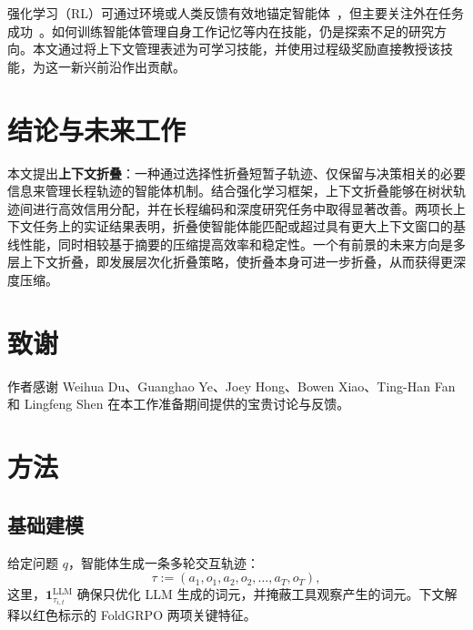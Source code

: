 强化学习（RL）可通过环境或人类反馈有效地锚定智能体~\citep{Zhang2025TheLO,Qiao2025WebResearcherUU}，但主要关注外在任务成功~\citep{DeepSeekAI2025DeepSeekR1IR}。如何训练智能体管理自身工作记忆等内在技能，仍是探索不足的研究方向。本文通过将上下文管理表述为可学习技能，并使用过程级奖励直接教授该技能，为这一新兴前沿作出贡献。

\section{结论与未来工作}
本文提出\textbf{上下文折叠}：一种通过选择性折叠短暂子轨迹、仅保留与决策相关的必要信息来管理长程轨迹的智能体机制。结合强化学习框架，上下文折叠能够在树状轨迹间进行高效信用分配，并在长程编码和深度研究任务中取得显著改善。两项长上下文任务上的实证结果表明，折叠使智能体能匹配或超过具有更大上下文窗口的基线性能，同时相较基于摘要的压缩提高效率和稳定性。一个有前景的未来方向是多层上下文折叠，即发展层次化折叠策略，使折叠本身可进一步折叠，从而获得更深度压缩。

\section*{致谢}
作者感谢 Weihua Du、Guanghao Ye、Joey Hong、Bowen Xiao、Ting-Han Fan 和 Lingfeng Shen 在本工作准备期间提供的宝贵讨论与反馈。

\section{方法}

\subsection{基础建模}
给定问题 $q$，智能体生成一条多轮交互轨迹：
\begin{equation}
    \tau := (a_1, o_1, a_2, o_2, \ldots, a_T, o_T),
\end{equation}
这里，$\mathbf{1}_{\tau_{i,t}}^{\mathrm{LLM}}$ 确保只优化 LLM 生成的词元，并掩蔽工具观察产生的词元。下文解释以红色标示的 FoldGRPO 两项关键特征。

